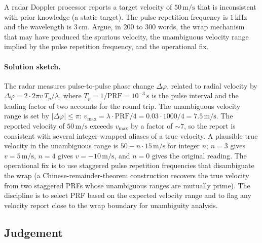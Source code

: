 \begin{exercise}
A radar Doppler processor reports a target velocity of $50 \,\si
{\meter\per\second}$ that is inconsistent with prior knowledge
(a static target). The pulse repetition frequency is $1 \,\si
{\kilo\hertz}$ and the wavelength is $3 \,\si{\centi\meter}$.
Argue, in 200 to 300 words, the wrap mechanism that may have
produced the spurious velocity, the unambiguous velocity range
implied by the pulse repetition frequency, and the operational
fix.

\paragraph{Solution sketch.}
The radar measures pulse-to-pulse phase change $\Delta\varphi$,
related to radial velocity by $\Delta\varphi = 2 \cdot 2\pi
v\,T_{p}/\lambda$, where $T_{p} = 1/\text{PRF} = 10^{-3}\,\si
{\second}$ is the pulse interval and the leading factor of two
accounts for the round trip. The unambiguous velocity range is
set by $|\Delta\varphi| \le \pi$: $v_{\max} = \lambda \cdot
\text{PRF}/4 = 0.03 \cdot 1000 / 4 = 7.5\,\si{\meter\per\second}$.
The reported velocity of $50\,\si{\meter\per\second}$ exceeds
$v_{\max}$ by a factor of $\sim 7$, so the report is consistent
with several integer-wrapped aliases of a true velocity. A
plausible true velocity in the unambiguous range is
$50 - n \cdot 15\,\si{\meter\per\second}$ for integer $n$;
$n = 3$ gives $v = 5\,\si{\meter\per\second}$, $n = 4$ gives
$v = -10\,\si{\meter\per\second}$, and $n = 0$ gives the original
reading. The operational fix is to use staggered pulse repetition
frequencies that disambiguate the wrap (a Chinese-remainder-theorem
construction recovers the true velocity from two staggered PRFs
whose unambiguous ranges are mutually prime). The discipline is
to select PRF based on the expected velocity range and to flag
any velocity report close to the wrap boundary for unambiguity
analysis.
\end{exercise}

\subsection*{Judgement}

